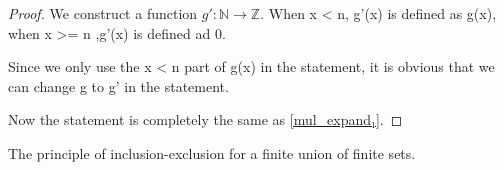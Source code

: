\begin{proof}
  \leanok
  We construct a function \( g' : \mathbb{N} \to \mathbb{Z} \). When x < n, g'(x) is defined as g(x), when x >= n ,g'(x) is defined ad 0.

  Since we only use the x < n part of g(x) in the statement, it is obvious that we can change g to g' in the statement.

  Now the statement is completely the same as \ref{mul_expand₁}.
\end{proof}

\begin{theorem}\label{Principle_of_Inclusion_Exclusion}
  \leanok
  The principle of inclusion-exclusion for a finite union of finite sets.
\end{theorem}

